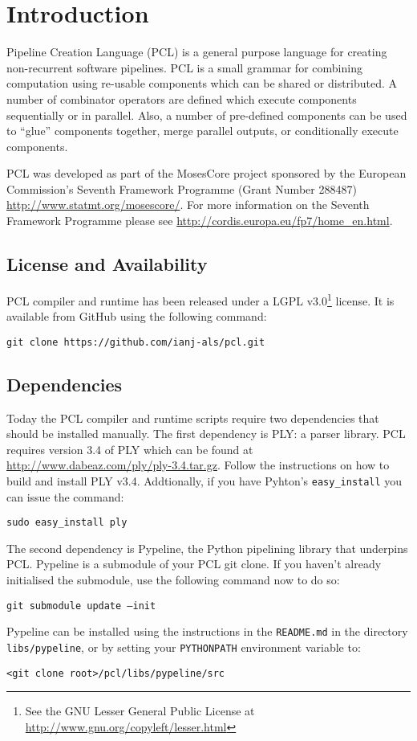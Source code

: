 \chapter{Introduction}
Pipeline Creation Language (PCL) is a general purpose language for creating non-recurrent software pipelines. PCL is a small grammar for combining computation using re-usable components which can be shared or distributed. A number of combinator operators are defined which execute components sequentially or in parallel. Also, a number of pre-defined components can be used to ``glue'' components together, merge parallel outputs, or conditionally execute components.

PCL was developed as part of the MosesCore project sponsored by the European Commission's Seventh Framework Programme (Grant Number 288487) \url{http://www.statmt.org/mosescore/}. For more information on the Seventh Framework Programme please see \url{http://cordis.europa.eu/fp7/home_en.html}.

\section{License and Availability}
PCL compiler and runtime has been released under a LGPL v3.0\footnote{See the GNU Lesser General Public License at \url{http://www.gnu.org/copyleft/lesser.html}} license. It is available from GitHub using the following command:
\begin{verbatim}
git clone https://github.com/ianj-als/pcl.git
\end{verbatim}

\section{Dependencies}
Today the PCL compiler and runtime scripts require two dependencies that should be installed manually. The first dependency is PLY: a parser library. PCL requires version 3.4 of PLY which can be found at \url{http://www.dabeaz.com/ply/ply-3.4.tar.gz}. Follow the instructions on how to build and install PLY v3.4. Addtionally, if you have Pyhton's \texttt{easy\_install} you can issue the command:
\begin{center}
\texttt{sudo easy\_install ply}
\end{center}

The second dependency is Pypeline, the Python pipelining library that underpins PCL. Pypeline is a submodule of your PCL git clone. If you haven't already initialised the submodule, use the following command now to do so:
\begin{center}
\texttt{git submodule update --init}
\end{center}
Pypeline can be installed using the instructions in the \texttt{README.md} in the directory \texttt{libs/pypeline}, or by setting your \texttt{PYTHONPATH} environment variable to:
\begin{center}
\texttt{<git clone root>/pcl/libs/pypeline/src}
\end{center}

